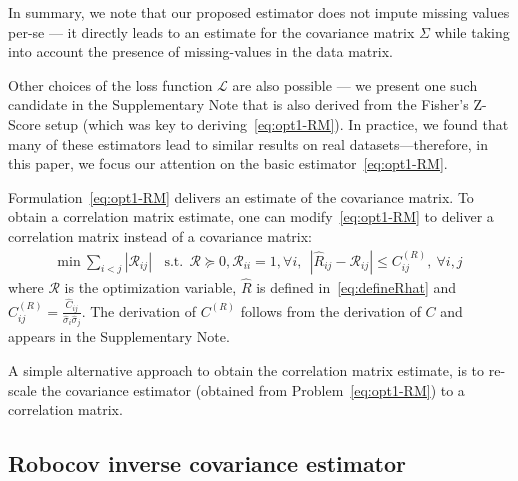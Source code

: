 In summary, we note that our proposed \Robocov{} estimator does not impute missing values per-se --- it directly leads to an estimate for the covariance matrix $\Sigma$ while taking into  account the presence of missing-values in the data matrix.  

Other choices of the loss function ${\mathcal L}$ are also possible --- we present one such candidate in the Supplementary Note that is also derived from the Fisher's Z-Score setup (which was key to deriving~\eqref{eq:opt1-RM}). In practice, we found that many of these estimators lead to similar results on real datasets---therefore, in this paper, we focus our attention on the basic estimator~\eqref{eq:opt1-RM}. 

\smallskip

Formulation~\eqref{eq:opt1-RM} delivers an estimate of the covariance matrix.
To obtain a correlation matrix estimate, 
one can modify~\eqref{eq:opt1-RM}
to deliver a correlation matrix instead of a covariance matrix: 
\begin{equation}\label{eq:opt1-RM-R}
 \begin{aligned}
    \text{min} ~ \sum_{i<j} |\mathcal{R}_{ij}|~~
    ~~\text{s.t.}~~\mathcal{R} \succeq 0, \mathcal{R}_{ii} = 1, \forall i,~~
   | \hat{R}_{ij} - \mathcal{R}_{ij} |  \leq  C^{(R)}_{ij}, ~\forall i,j
 \end{aligned}
\end{equation}
where $\mathcal{R}$ is the optimization variable, $\hat{R}$ is
defined in~\eqref{eq:defineRhat} and $C^{(R)}_{ij} = \frac{\hat{C}_{ij}}{\hat{\sigma}_{i} \hat{\sigma}_{j}}$. The derivation of $C^{(R)}$ follows from the derivation of $C$ and appears in the Supplementary Note.

A simple alternative approach to obtain the \Robocov{} correlation matrix estimate, is to re-scale the \Robocov{} covariance estimator (obtained from Problem~\eqref{eq:opt1-RM}) to a correlation matrix. 




\subsection{Robocov inverse covariance estimator}\label{sec:invcov-estimator}

